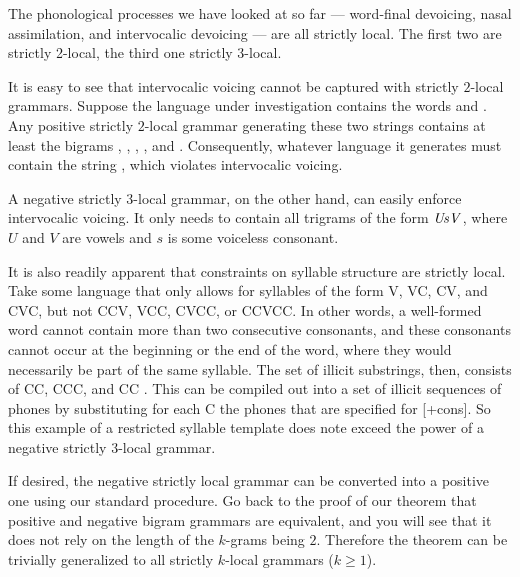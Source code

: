 The phonological processes we have looked at so far --- word-final devoicing, nasal assimilation, and intervocalic devoicing --- are all strictly local.
The first two are strictly 2-local, the third one strictly 3-local.
%
\begin{examplebox}
    It is easy to see that intervocalic voicing cannot be captured with strictly $2$-local grammars.
    Suppose the language under investigation contains the words  and .
    Any positive strictly $2$-local grammar generating these two strings contains at least the bigrams \LeftEdge{}, , , , and .
    Consequently, whatever language it generates must contain the string , which violates intervocalic voicing.

    A negative strictly $3$-local grammar, on the other hand, can easily enforce intervocalic voicing.
    It only needs to contain all trigrams of the form $\mathit{UsV}$, where $U$ and $V$ are vowels and $s$ is some voiceless consonant.
\end{examplebox}
%
It is also readily apparent that constraints on syllable structure are strictly local.
Take some language that only allows for syllables of the form V, VC, CV, and CVC, but not CCV, VCC, CVCC, or CCVCC\@.
In other words, a well-formed word cannot contain more than two consecutive consonants, and these consonants cannot occur at the beginning or the end of the word, where they would necessarily be part of the same syllable.
The set of illicit substrings, then, consists of \LeftEdge CC, CCC, and CC \RightEdge.
This can be compiled out into a set of illicit sequences of phones by substituting for each C the phones that are specified for [+cons].
So this example of a restricted syllable template does note exceed the power of a negative strictly $3$-local grammar.

If desired, the negative strictly local grammar can be converted into a positive one using our standard procedure.
Go back to the proof of our theorem that positive and negative bigram grammars are equivalent, and you will see that it does not rely on the length of the $k$-grams being $2$.
Therefore the theorem can be trivially generalized to all strictly $k$-local grammars ($k \geq 1$).


